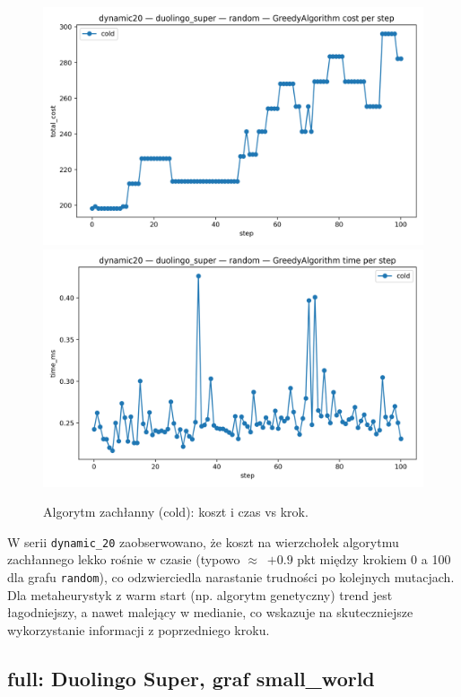 \begin{figure}[H]
  \centering
  \includegraphics[width=0.48\linewidth]{assets/figures/dynamic/dynamic20/duolingo_super/random/GreedyAlgorithm_cost_per_step.png}
  \includegraphics[width=0.48\linewidth]{assets/figures/dynamic/dynamic20/duolingo_super/random/GreedyAlgorithm_time_per_step.png}
\caption{Algorytm zachłanny (cold): koszt i czas vs krok.}
  \label{fig:dyn20_duo_greedy}
\end{figure}

W serii \texttt{dynamic\_20} zaobserwowano, że koszt na wierzchołek algorytmu zachłannego lekko rośnie w czasie (typowo $\approx$~$+0.9$ pkt między krokiem 0 a 100 dla grafu \texttt{random}), co odzwierciedla narastanie trudności po kolejnych mutacjach. Dla metaheurystyk z warm start (np. algorytm genetyczny) trend jest łagodniejszy, a nawet malejący w medianie, co wskazuje na skuteczniejsze wykorzystanie informacji z poprzedniego kroku.

\subsection{full: Duolingo Super, graf small\_world}

